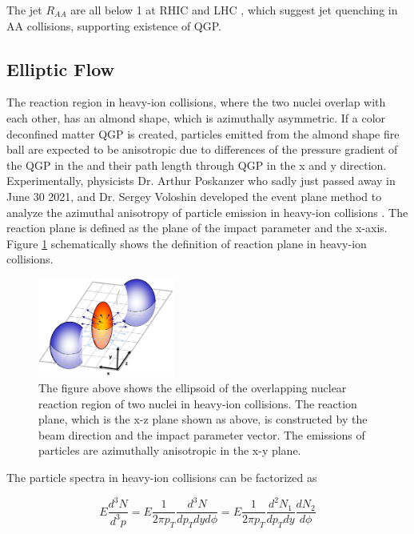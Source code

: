 The jet $R_{AA}$ are all below 1 at RHIC and LHC \cite{ALICEJetRef,CMSJetSub}, which suggest jet quenching in AA collisions, supporting existence of QGP.

\subsection{Elliptic Flow} 

The reaction region in heavy-ion collisions, where the two nuclei overlap with each other, has an almond shape, which is azimuthally asymmetric. If a color deconfined matter QGP is created, particles emitted from the almond shape fire ball are expected to be anisotropic due to differences of the pressure gradient of the QGP in the and their path length through QGP in the x and y direction. Experimentally, physicists Dr. Arthur Poskanzer who sadly just passed away in June 30 2021, and Dr. Sergey Voloshin developed the event plane method to analyze the azimuthal anisotropy of particle emission in heavy-ion collisions \cite{EllipticFlow}. The reaction plane is defined as the plane of the impact parameter and the x-axis. Figure \ref{EventPlane} schematically shows the definition of reaction plane in heavy-ion collisions.

\begin{figure}[hbtp]
\begin{center}
\includegraphics[width=0.40\textwidth]{Figures/Chapter1/ReactionPlane.jpg}
\caption{The figure above shows the ellipsoid of the overlapping nuclear reaction region of two nuclei in heavy-ion collisions. The reaction plane, which is the x-z plane shown as above, is constructed by the beam direction and the impact parameter vector. The emissions of particles are azimuthally anisotropic in the x-y plane.}
\label{EventPlane}
\end{center}
\end{figure} 

The particle spectra in heavy-ion collisions can be factorized as 

\begin{equation}
E \frac{d^3N}{d^3p} = E \frac{1}{2 \pi p_T}\frac{d^3N}{dp_T dy d\phi} = E \frac{1}{2 \pi p_T} \frac{d^2N_1}{dp_T dy} \frac{dN_2}{d\phi}
\end{equation}

